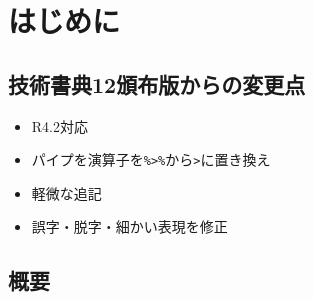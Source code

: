 \documentclass[
  xelatex,ja=standard, b5paper]{bxjsbook}
\author{}
\date{\vspace{-2.5em}}
\providecommand{\tightlist}{%
  \setlength{\itemsep}{0pt}\setlength{\parskip}{0pt}}
\begin{document}
{
\setcounter{tocdepth}{1}
\tableofcontents
}
\hypertarget{hajimeni}{%
\chapter*{はじめに}\label{hajimeni}}

\hypertarget{ux6280ux8853ux66f8ux517812ux9812ux5e03ux7248ux304bux3089ux306eux5909ux66f4ux70b9}{%
\section*{技術書典12頒布版からの変更点}\label{ux6280ux8853ux66f8ux517812ux9812ux5e03ux7248ux304bux3089ux306eux5909ux66f4ux70b9}}

\begin{itemize}
\tightlist
\item
  R4.2対応
\item
  パイプを演算子を\texttt{\%\textgreater{}\%}から\texttt{\textbar{}\textgreater{}}に置き換え
\item
  軽微な追記
\item
  誤字・脱字・細かい表現を修正
\end{itemize}

\hypertarget{ux6982ux8981}{%
\section*{概要}\label{ux6982ux8981}}
\end{document}
